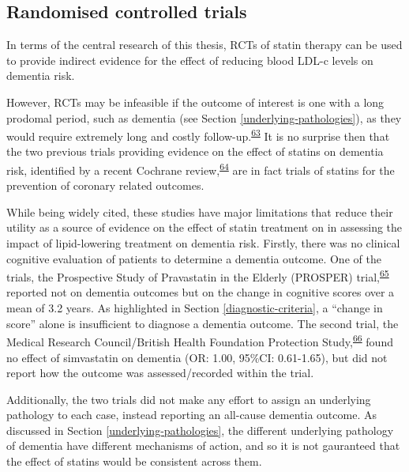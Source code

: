 \documentclass[a4paper, twoside]{templates/ociamthesis}
\begin{document}
\hypertarget{randomised-controlled-trials}{%
\subsection{Randomised controlled trials}\label{randomised-controlled-trials}}

In terms of the central research of this thesis, RCTs of statin therapy can be used to provide indirect evidence for the effect of reducing blood LDL-c levels on dementia risk.

However, RCTs may be infeasible if the outcome of interest is one with a long prodomal period, such as dementia (see Section \ref{underlying-pathologies}), as they would require extremely long and costly follow-up.\textsuperscript{\protect\hyperlink{ref-ritchie2015}{63}} It is no surprise then that the two previous trials providing evidence on the effect of statins on dementia risk, identified by a recent Cochrane review,\textsuperscript{\protect\hyperlink{ref-mcguinness2016}{64}} are in fact trials of statins for the prevention of coronary related outcomes.

While being widely cited, these studies have major limitations that reduce their utility as a source of evidence on the effect of statin treatment on in assessing the impact of lipid-lowering treatment on dementia risk. Firstly, there was no clinical cognitive evaluation of patients to determine a dementia outcome. One of the trials, the Prospective Study of Pravastatin in the Elderly (PROSPER) trial,\textsuperscript{\protect\hyperlink{ref-trompet2010}{65}} reported not on dementia outcomes but on the change in cognitive scores over a mean of 3.2 years. As highlighted in Section \ref{diagnostic-criteria}, a ``change in score'' alone is insufficient to diagnose a dementia outcome. The second trial, the Medical Research Council/British Health Foundation Protection Study,\textsuperscript{\protect\hyperlink{ref-heartprotectionstudycollaborativegroup2002}{66}} found no effect of simvastatin on dementia (OR: 1.00, 95\%CI: 0.61-1.65), but did not report how the outcome was assessed/recorded within the trial.

Additionally, the two trials did not make any effort to assign an underlying pathology to each case, instead reporting an all-cause dementia outcome. As discussed in Section \ref{underlying-pathologies}, the different underlying pathology of dementia have different mechanisms of action, and so it is not gauranteed that the effect of statins would be consistent across them.
\end{document}
